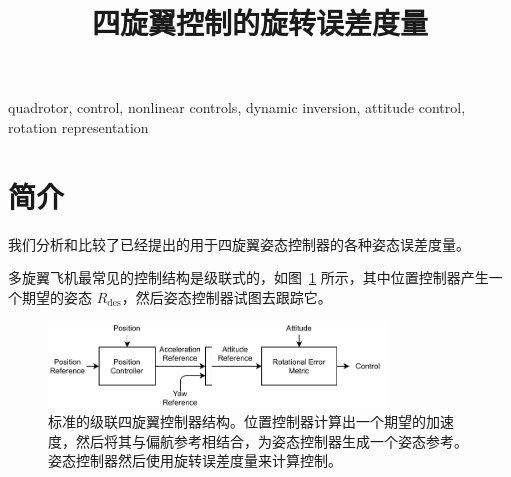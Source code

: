 \documentclass[conference]{IEEEtran}
\begin{document}
\title{四旋翼控制的旋转误差度量}

\author{
\and
{}
}

\maketitle



\begin{IEEEkeywords}
  quadrotor, control, nonlinear controls, dynamic inversion, attitude control, rotation representation
\end{IEEEkeywords}


\section{简介}

我们分析和比较了已经提出的用于四旋翼姿态控制器的各种姿态误差度量。

多旋翼飞机最常见的控制结构是级联式的，如图~\ref{fig:control_diag} 所示，其中位置控制器产生一个期望的姿态 $R_{\text{des}}$，然后姿态控制器试图去跟踪它。

\begin{figure}
  \begin{center}
  \includegraphics[width=9cm]{media/controllers.pdf}
  \caption{标准的级联四旋翼控制器结构。位置控制器计算出一个期望的加速度，然后将其与偏航参考相结合，为姿态控制器生成一个姿态参考。姿态控制器然后使用旋转误差度量来计算控制。}
  \label{fig:control_diag}
  \end{center}
\end{figure}
\end{document}

